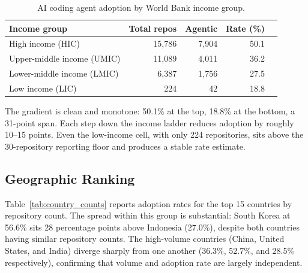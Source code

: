\begin{table}[h]
\centering
\caption{AI coding agent adoption by World Bank income group.}
\label{tab:income}
\begin{tabular}{@{}lrrrr@{}}
\toprule
Income group & Total repos & Agentic & Rate (\%) \\
\midrule
High income (HIC)                 & 15,786 & 7,904 & 50.1 \\
Upper-middle income (UMIC)        & 11,089 & 4,011 & 36.2 \\
Lower-middle income (LMIC)        &  6,387 & 1,756 & 27.5 \\
Low income (LIC)                  &    224 &    42 & 18.8 \\
\bottomrule
\end{tabular}
\end{table}

The gradient is clean and monotone: 50.1\% at the top, 18.8\% at the bottom, a 31-point span. Each step down the income ladder reduces adoption by roughly 10--15 points. Even the low-income cell, with only 224 repositories, sits above the 30-repository reporting floor and produces a stable rate estimate.

\subsection{Geographic Ranking}

Table~\ref{tab:country_counts} reports adoption rates for the top 15 countries by repository count. The spread within this group is substantial: South Korea at 56.6\% sits 28 percentage points above Indonesia (27.0\%), despite both countries having similar repository counts. The high-volume countries (China, United States, and India) diverge sharply from one another (36.3\%, 52.7\%, and 28.5\% respectively), confirming that volume and adoption rate are largely independent.

